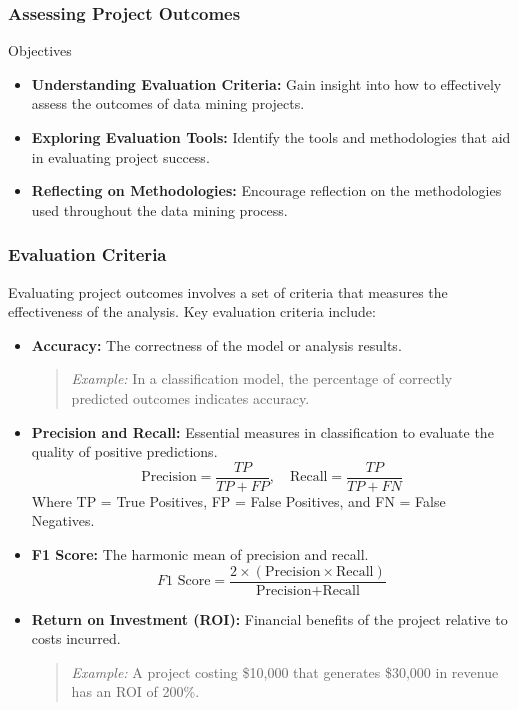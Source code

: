 \documentclass[aspectratio=169]{beamer}
\begin{document}
\begin{frame}[fragile]
    \frametitle{Assessing Project Outcomes}
    \begin{block}{Objectives}
        \begin{itemize}
            \item \textbf{Understanding Evaluation Criteria:} Gain insight into how to effectively assess the outcomes of data mining projects.
            \item \textbf{Exploring Evaluation Tools:} Identify the tools and methodologies that aid in evaluating project success.
            \item \textbf{Reflecting on Methodologies:} Encourage reflection on the methodologies used throughout the data mining process.
        \end{itemize}
    \end{block}
\end{frame}

\begin{frame}[fragile]
    \frametitle{Evaluation Criteria}
    Evaluating project outcomes involves a set of criteria that measures the effectiveness of the analysis. Key evaluation criteria include:
    
    \begin{itemize}
        \item \textbf{Accuracy:} The correctness of the model or analysis results.
        \begin{quote}
        \textit{Example:} In a classification model, the percentage of correctly predicted outcomes indicates accuracy.
        \end{quote}
        
        \item \textbf{Precision and Recall:} Essential measures in classification to evaluate the quality of positive predictions.
        \begin{equation}
            \text{Precision} = \frac{TP}{TP + FP}, \quad \text{Recall} = \frac{TP}{TP + FN} 
        \end{equation}
        Where TP = True Positives, FP = False Positives, and FN = False Negatives.

        \item \textbf{F1 Score:} The harmonic mean of precision and recall.
        \begin{equation}
            F1\text{ Score} = \frac{2 \times (\text{Precision} \times \text{Recall})}{\text{Precision} + \text{Recall}}
        \end{equation}

        \item \textbf{Return on Investment (ROI):} Financial benefits of the project relative to costs incurred.
        \begin{quote}
        \textit{Example:} A project costing \$10,000 that generates \$30,000 in revenue has an ROI of 200\%.
        \end{quote}
    \end{itemize}
\end{frame}
\end{document}
